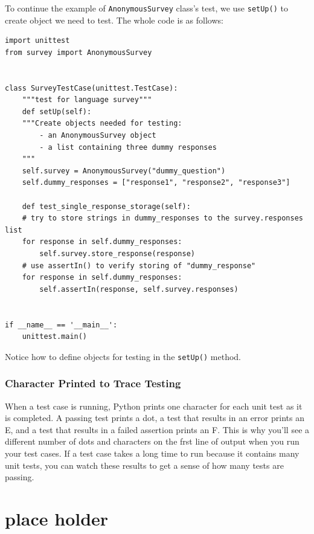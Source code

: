 \documentclass[12pt]{book}
\begin{document}
To continue the example of \texttt{AnonymousSurvey} class's test, we use \texttt{setUp()} to create object we need to test. The whole code is as follows:
\begin{verbatim}
import unittest
from survey import AnonymousSurvey


class SurveyTestCase(unittest.TestCase):
    """test for language survey"""
    def setUp(self):
	"""Create objects needed for testing:
	    - an AnonymousSurvey object
	    - a list containing three dummy responses
	"""
	self.survey = AnonymousSurvey("dummy_question")
	self.dummy_responses = ["response1", "response2", "response3"]

    def test_single_response_storage(self):
	# try to store strings in dummy_responses to the survey.responses list
	for response in self.dummy_responses:
	    self.survey.store_response(response)
	# use assertIn() to verify storing of "dummy_response"
	for response in self.dummy_responses:
	    self.assertIn(response, self.survey.responses)


if __name__ == '__main__':
    unittest.main()

\end{verbatim}
Notice how to define objects for testing in the \texttt{setUp()} method.

\subsection{Character Printed to Trace Testing}
\label{sec:orga03b766}
When a test case is running, Python prints one character for each unit test as it is completed. A passing test prints a dot, a test that results in an error prints an E, and a test that results in a failed assertion prints an F. This is why you’ll see a different number of dots and characters on the frst line of output when you run your test cases. If a test case takes a long time to run because it contains many unit tests, you can watch these results to get a sense of how many tests are passing.
\chapter{place holder}
\label{sec:orgbac00d7}
\end{document}

